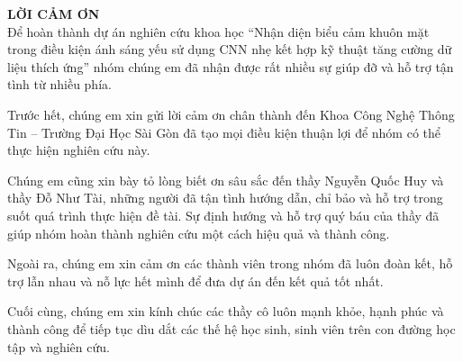 {\LARGE \textbf{LỜI CẢM ƠN}} \\[1cm]

Để hoàn thành dự án nghiên cứu khoa học “Nhận diện biểu cảm khuôn mặt trong điều kiện ánh sáng yếu sử dụng CNN nhẹ kết hợp kỹ thuật tăng cường dữ liệu thích ứng” nhóm chúng em đã nhận được rất nhiều sự giúp đỡ và hỗ trợ tận tình từ nhiều phía.

Trước hết, chúng em xin gửi lời cảm ơn chân thành đến Khoa Công Nghệ Thông Tin – Trường Đại Học Sài Gòn đã tạo mọi điều kiện thuận lợi để nhóm có thể thực hiện nghiên cứu này.

Chúng em cũng xin bày tỏ lòng biết ơn sâu sắc đến thầy Nguyễn Quốc Huy và thầy Đỗ Như Tài, những người đã tận tình hướng dẫn, chỉ bảo và hỗ trợ trong suốt quá trình thực hiện đề tài. Sự định hướng và hỗ trợ quý báu của thầy đã giúp nhóm hoàn thành nghiên cứu một cách hiệu quả và thành công.

Ngoài ra, chúng em xin cảm ơn các thành viên trong nhóm đã luôn đoàn kết, hỗ trợ lẫn nhau và nỗ lực hết mình để đưa dự án đến kết quả tốt nhất.

Cuối cùng, chúng em xin kính chúc các thầy cô luôn mạnh khỏe, hạnh phúc và thành công để tiếp tục dìu dắt các thế hệ học sinh, sinh viên trên con đường học tập và nghiên cứu.